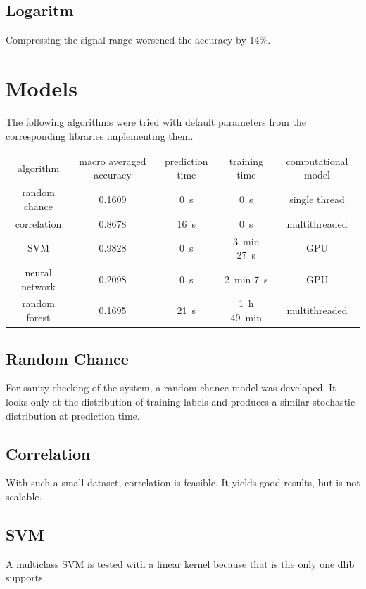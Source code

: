 \documentclass{article}
\begin{document}
\subsection{Logaritm}
Compressing the signal range worsened the accuracy by 14\%.


\section{Models}
The following algorithms were tried with default parameters from the corresponding libraries implementing them.
\\ \par
{}
\begin{tabular}{ c | c | c | c | c }
algorithm      & macro averaged accuracy & prediction time  & training time                    & computational model \\
random chance  & 0.1609                  & \SI{0}{\second}  & \SI{0}{\second}                  & single thread \\
correlation    & 0.8678                  & \SI{16}{\second} & \SI{0}{\second}                  & multithreaded \\
SVM            & 0.9828                  & \SI{0}{\second}  & \SI{3}{\minute} \SI{27}{\second} & GPU \\
neural network & 0.2098                  & \SI{0}{\second}  & \SI{2}{\minute} \SI{7}{\second}  & GPU \\
random forest  & 0.1695                  & \SI{21}{\second} & \SI{1}{\hour} \SI{49}{\minute}   & multithreaded \\
\end{tabular}


\subsection{Random Chance}
For sanity checking of the system, a random chance model was developed.
It looks only at the distribution of training labels and produces a similar stochastic distribution at prediction time.


\subsection{Correlation}
With such a small dataset, correlation is feasible.
It yields good results, but is not scalable.


\subsection{SVM}
A multiclass SVM is tested with a linear kernel because that is the only one dlib supports.
\end{document}
